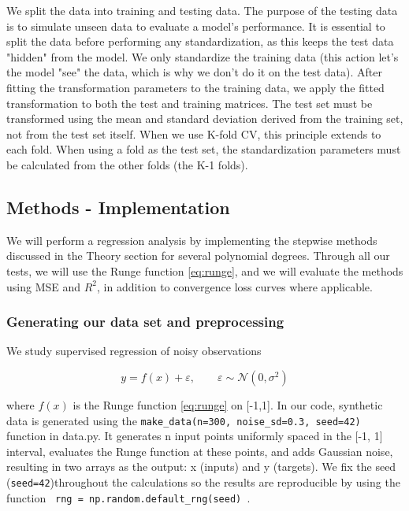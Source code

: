 \documentclass[amssymb,twocolumn,aps]{revtex4-2}
\begin{document}
We split the data into training and testing data. The purpose of the testing data is to simulate unseen data to evaluate a model's performance. It is essential to split the data before performing any standardization, as this keeps the test data "hidden" from the model. We only standardize the training data (this action let's the model "see" the data, which is why we don't do it on the test data). After fitting the transformation parameters to the training data, we apply the fitted transformation to both the test and training matrices. The test set must be transformed using the mean and standard deviation derived from the training set, not from the test set itself. When we use K-fold CV, this principle extends to each fold. When using a fold as the test set, the standardization parameters must be calculated from the other folds (the K-1 folds). 

\subsection{Methods - Implementation}
\label{section:methods}

We will perform a regression analysis by implementing the stepwise methods discussed in the Theory section for several polynomial degrees. Through all our tests, we will use the Runge function \eqref{eq:runge}, and we will evaluate the methods using MSE and $R^2$, in addition to convergence loss curves where applicable. 


\subsubsection{Generating our data set and preprocessing}
 \label{subsubsec:data_method}

We study supervised regression of noisy observations 

\begin{equation}
    y = f(x) + \varepsilon, \qquad \varepsilon \sim \mathcal{N}(0,\sigma^2)
\end{equation}

where $f(x)$ is the Runge function \eqref{eq:runge} on [-1,1]. In our code, synthetic data is generated using the \texttt{make\_data(n=300, noise\_sd=0.3, seed=42)} function in data.py. It generates n input points uniformly spaced in the [-1, 1] interval, evaluates the Runge function at these points, and adds Gaussian noise, resulting in two arrays as the output: x (inputs) and y (targets). We fix the seed (\texttt{seed=42})throughout the calculations so the results are reproducible by using the function \texttt{ rng = np.random.default\_rng(seed) }.  \\
\end{document}
